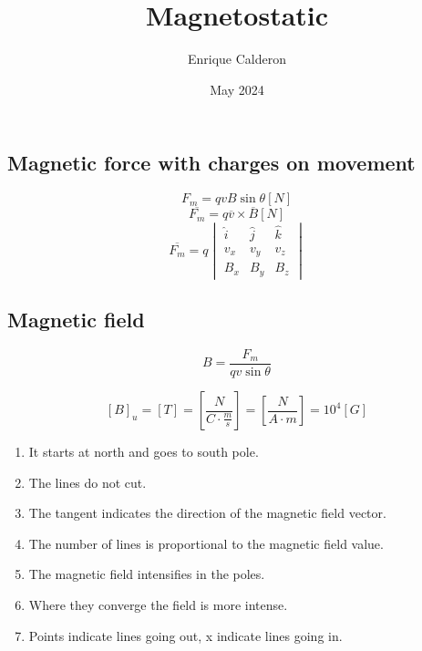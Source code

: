 \documentclass[letterpaper]{article}
\title{Magnetostatic}
\author{Enrique Calderon}
\date{May 2024}
\newcommand{\divline}{\noindent\makebox[\linewidth]{\rule{\textwidth}{0.4pt}}}
\begin{document}
    \maketitle
    \divline
    
    \begin{multicols}{2}
        \section{Magnetic force with charges on movement}

        \[F_m = q v B \sin{\theta} [N]\]
        \[\overline{F_m} = q \overline{v} \times \overline{B} [N]\]
        \[ \overline{F_m} = q 
        \begin{vmatrix}
            \hat{i} & \hat{j} & \hat{k} \\
            v_x & v_y & v_z \\
            B_x & B_y & B_z
        \end{vmatrix}
        \]
    \end{multicols}
    \divline

    \begin{multicols}{2}
        \section{Magnetic field}

        \[B = \frac{F_m}{qv\sin{\theta}}\]

        \[{[B]}_u = [T] = \left[ \frac{N}{C \cdot \frac{m}{s}} \right] = \left[ \frac{N}{A \cdot m} \right] = {10}^4 [G] \]

        \begin{enumerate}
            \item It starts at north and goes to south pole.
            \item The lines do not cut.
            \item The tangent indicates the direction of the magnetic field vector.
            \item The number of lines is proportional to the magnetic field value.
            \item The magnetic field intensifies in the poles.
            \item Where they converge the field is more intense.
            \item Points indicate lines going out, x indicate lines going in.
        \end{enumerate}
    \end{multicols}
    \divline
\end{document}
